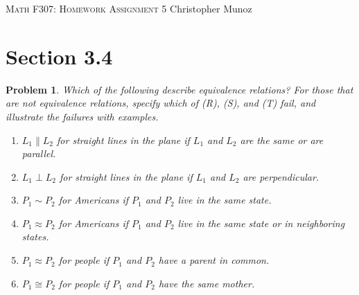 \documentclass[12pt]{article}
\newtheorem{problem}{Problem}
\begin{document}
\small
\noindent \textsc{Math F307: Homework Assignment 5} \hfill Christopher Munoz

\normalsize
\bigskip

\section*{Section 3.4}

\setcounter{problem}{0}
\begin{problem}
Which of the following describe equivalence relations? For those that are not equivalence relations, specify which of (R), (S), and (T) fail, and illustrate the failures with examples.

\begin{enumerate}[label=(\alph*)]
    \item $L_1 \parallel L_2$ for straight lines in the plane if $L_1$ and $L_2$ are the same or are parallel.

    \item $L_1 \perp L_2$ for straight lines in the plane if $L_1$ and $L_2$ are perpendicular.

    \item $P_1 \sim P_2$ for Americans if $P_1$ and $P_2$ live in the same state.

    \item $P_1 \approx P_2$ for Americans if $P_1$ and $P_2$ live in the same state or in neighboring states.

    \item $P_1 \approx P_2$ for people if $P_1$ and $P_2$ have a parent in common.

    \item $P_1 \cong P_2$ for people if $P_1$ and $P_2$ have the same mother.
\end{enumerate}
\end{problem}
\end{document}
